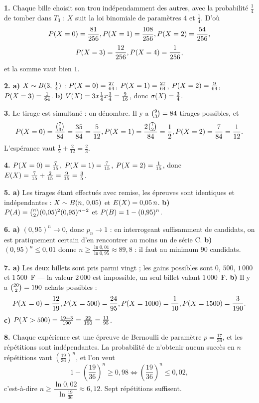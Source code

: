 \begin{corrige}[annales]
\textbf{1.} Chaque bille choisit son trou indépendamment des autres, avec la
probabilité $\frac14$ de tomber dans $T_{3}$ : $X$ suit la loi binomiale de
paramètres $4$ et $\frac14$. D'où
\[
  \proba{X = 0} = \frac{81}{256}, \quad
  \proba{X = 1} = \frac{108}{256}, \quad
  \proba{X = 2} = \frac{54}{256},
\]
\[
  \proba{X = 3} = \frac{12}{256}, \quad
  \proba{X = 4} = \frac{1}{256},
\]
et la somme vaut bien $1$.

\textbf{2. a)} $X \sim \loibin{3}{\frac14}$ :
$\proba{X = 0} = \frac{27}{64}$, $\proba{X = 1} = \frac{27}{64}$,
$\proba{X = 2} = \frac{9}{64}$, $\proba{X = 3} = \frac{1}{64}$.
\textbf{b)} $\Var(X) = 3 \times \frac14 \times \frac34 = \frac{9}{16}$, donc
$\ecart(X) = \frac34$.

\textbf{3.} Le tirage est simultané : on dénombre. Il y a
$\combi{3}{9} = 84$ tirages possibles, et
\[
  \proba{X = 0} = \frac{\combi{3}{7}}{84} = \frac{35}{84} = \frac{5}{12},
  \quad
  \proba{X = 1} = \frac{2\combi{2}{7}}{84} = \frac12,
  \quad
  \proba{X = 2} = \frac{7}{84} = \frac{1}{12}.
\]
L'espérance vaut $\frac12+\frac{2}{12} = \frac23$.

\textbf{4.} $\proba{X = 0} = \frac{7}{15}$, $\proba{X = 1} = \frac{7}{15}$,
$\proba{X = 2} = \frac{1}{15}$, donc
$\Esp(X) = \frac{7}{15}+\frac{2}{15} = \frac{9}{15} = \frac35$.

\textbf{5. a)} Les tirages étant effectués avec remise, les épreuves sont
identiques et indépendantes : $X \sim \loibin{n}{0{,}05}$ et
$\Esp(X) = 0{,}05\,n$.
\textbf{b)} $\proba{A} = \combi{2}{n}(0{,}05)^{2}(0{,}95)^{n-2}$ et
$\proba{B} = 1-(0{,}95)^{n}$.

\textbf{6. a)} $(0{,}95)^{n} \to 0$, donc $p_{n} \to 1$ : en interrogeant
suffisamment de candidats, on est pratiquement certain d'en rencontrer au
moins un de série C.
\textbf{b)} $(0{,}95)^{n} \leq 0{,}01$ donne
$n \geq \frac{\ln0{,}01}{\ln0{,}95} \approx 89{,}8$ : il faut au minimum
$90$ candidats.

\textbf{7. a)} Les deux billets sont pris parmi vingt ; les gains possibles
sont $0$, $500$, $1\,000$ et $1\,500$~F — la valeur $2\,000$ est impossible,
un seul billet valant $1\,000$~F.
\textbf{b)} Il y a $\combi{2}{20} = 190$ achats possibles :
\[
  \proba{X = 0} = \frac{12}{19}, \quad
  \proba{X = 500} = \frac{24}{95}, \quad
  \proba{X = 1000} = \frac{1}{10}, \quad
  \proba{X = 1500} = \frac{3}{190}.
\]
\textbf{c)} $\proba{X>500} = \frac{19+3}{190} = \frac{22}{190}
= \frac{11}{95}$.

\textbf{8.} Chaque expérience est une épreuve de Bernoulli de paramètre
$p = \frac{17}{36}$, et les répétitions sont indépendantes. La probabilité de
n'obtenir aucun succès en $n$ répétitions vaut
$\left(\frac{19}{36}\right)^{n}$, et l'on veut
\[
  1-\left(\frac{19}{36}\right)^{n} \geq 0{,}98
  \iff \left(\frac{19}{36}\right)^{n} \leq 0{,}02,
\]
c'est-à-dire $n \geq \dfrac{\ln 0{,}02}{\ln\frac{19}{36}} \approx 6{,}12$.
Sept répétitions suffisent.
\end{corrige}

